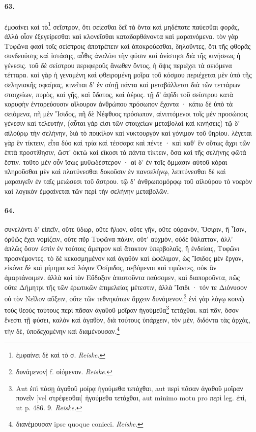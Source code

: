 \documentclass[a4paper, 11pt, oneside, polutonikogreek, german]{article}
\begin{document}
\paragraph{63.}
ἐμφαίνει καὶ τὸ\footnote{ἐμφαίνει δὲ καὶ τὸ σ. \emph{Reiske.}} σεῖστρον, ὅτι σείεσθαι δεῖ τὰ ὄντα καὶ μηδέποτε παύεσθαι φορᾶς, ἀλλὰ οἷον ἐξεγείρεσθαι καὶ κλονεῖσθαι καταδαρθάνοντα καὶ μαραινόμενα. τὸν γὰρ Τυφῶνα φασὶ τοῖς σείστροις ἀποτρέπειν καὶ ἀποκρούεσθαι, δηλοῦντες, ὅτι τῆς φθορᾶς συνδεούσης καὶ ἱστάσης, αὖθις ἀναλύει τὴν φύσιν καὶ ἀνίστησι διὰ τῆς κινήσεως ἡ γένεσις. τοῦ δὲ σείστρου περιφεροῦς ἄνωθεν ὄντος, ἡ ὄψις περιέχει τὰ σειόμενα τέτταρα. καὶ γὰρ ἡ γενομένη καὶ φθειρομένη μοῖρα τοῦ κόσμου περιέχεται μὲν ὑπὸ τῆς σεληνιακῆς σφαίρας, κινεῖται δ' ἐν αὐτῇ πάντα καὶ μεταβάλλεται διὰ τῶν τεττάρων στοιχείων, πυρὸς, καὶ γῆς, καὶ ὕδατος, καὶ ἀέρος. τῇ δ' ἀψῖδι τοῦ σείστρου κατὰ κορυφὴν ἐντορεύουσιν αἴλουρον ἀνθρώπου πρόσωπον ἔχοντα · κάτω δὲ ὑπὸ τὰ σειόμενα, πῆ μὲν Ἴσιδος, πῆ δὲ Νέφθυος πρόσωπον, αἰνιττόμενοι τοῖς μὲν προσώποις γένεσιν καὶ τελευτὴν, (αὗται γάρ εἰσι τῶν στοιχείων μεταβολαὶ καὶ κινήσεις) τῷ δ' αἰλούρῳ τὴν σελήνην, διὰ τὸ ποικίλον καὶ νυκτουργὸν καὶ γόνιμον τοῦ θηρίου. λέγεται γὰρ ἓν τίκτειν, εἶτα δύο καὶ τρία καὶ τέσσαρα καὶ πέντε · καὶ καθ' ἓν οὕτως ἄχρι τῶν ἑπτὰ προστίθησιν, ὥστ' ὀκτὼ καὶ εἴκοσι τὰ πάντα τίκτειν, ὅσα καὶ τῆς σελήνης φῶτά ἔστιν. τοῦτο μὲν οὖν ἴσως μυθωδέστερον · αἱ δ' ἐν τοῖς ὄμμασιν αὐτοῦ κόραι πληροῦσθαι μὲν καὶ πλατύνεσθαι δοκοῦσιν ἐν πανσελήνῳ, λεπτύνεσθαι δὲ καὶ μαραυγεῖν ἐν ταῖς μειώσεσι τοῦ ἄστρου. τῷ δ' ἀνθρωπομόρφῳ τοῦ αἰλούρου τὸ νοερὸν καὶ λογικὸν ἐμφαίνεται τῶν περὶ τὴν σελήνην μεταβολῶν.

\paragraph{64.}
συνελόντι δ' εἰπεῖν, οὔτε ὕδωρ, οὔτε ἥλιον, οὔτε γῆν, οὔτε οὐρανὸν, Ὄσιριν, ἢ Ἶσιν, ὀρθῶς ἔχει νομίζειν, οὔτε πῦρ Τυφῶνα πάλιν, οὔτ' αὐχμὸν, οὐδὲ θάλατταν, ἀλλ' ἁπλῶς ὅσον ἐστὶν ἐν τούτοις ἄμετρον καὶ ἄτακτον ὑπερβολαῖς, ἢ ἐνδείαις, Τυφῶνι προσνέμοντες. τὸ δὲ κεκοσμημένον καὶ ἀγαθὸν καὶ ὠφέλιμον, ὡς Ἴσιδος μὲν ἔργον, εἰκόνα δὲ καὶ μίμημα καὶ λόγον Ὀσίριδος, σεβόμενοι καὶ τιμῶντες, οὐκ ἂν ἁμαρτάνοιμεν. ἀλλὰ καὶ τὸν Εὔδοξον ἀπιστοῦντα παύσομεν, καὶ διαποροῦντα, πῶς οὔτε Δήμητρι τῆς τῶν ἐρωτικῶν ἐπιμελείας μέτεστιν, ἀλλὰ Ἴσιδι · τόν τε Διόνυσον οὐ τὸν Νεῖλον αὔξειν, οὔτε τῶν τεθνηκότων ἄρχειν δυνάμενον.\footnote{δυνάμενον] f. οἰόμενον. \emph{Reiske.}} ἑνὶ γὰρ λόγῳ κοινῷ τοὺς θεοὺς τούτους περὶ πᾶσαν ἀγαθοῦ μοῖραν ἡγούμεθα\footnote{Aut ἐπὶ πάσῃ ἀγαθοῦ μοίρᾳ ἡγούμεθα τετάχθαι, aut περὶ πᾶσαν ἀγαθοῦ μοῖραν πονεῖν [vel στρέφεσθαι] ἡγούμεθα τετάχθαι, aut minimo motu pro περὶ leg. ἐπὶ, ut p. 486. 9. \emph{Reiske.}} τετάχθαι. καὶ πᾶν, ὅσον ἔνεστι τῇ φύσει, καλὸν καὶ ἀγαθὸν, διὰ τούτους ὑπάρχειν, τὸν μὲν, διδόντα τὰς ἀρχὰς, τὴν δὲ, ὑποδεχομένην καὶ διαμένουσαν.\footnote{διανέμουσαν ipse quoque conieci. \emph{Reiske.}}
\end{document}
